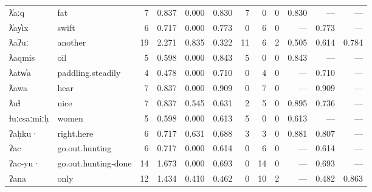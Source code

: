 \begin{landscape}
\begin{longtable}[c]{ l l | r r c c | r r r | r r r }
  ƛ̓aːq               & fat                       & 7   & 0.837                     & 0.000           & 0.830      & 7         & 0           & 0            & 0.830     & —           & —\\
  ƛ̓ay̓ix              & swift                     & 6   & 0.717                     & 0.000           & 0.773      & 0         & 6           & 0            & —         & 0.773       & —\\
  ƛaʔuː              & another                   & 19  & 2.271                     & 0.835           & 0.322      & 11        & 6           & 2            & 0.505     & 0.614       & 0.784\\
  ƛaqmis             & oil                       & 5   & 0.598                     & 0.000           & 0.843      & 5         & 0           & 0            & 0.843     & —           & —\\
  ƛatw̓a              & paddling.steadily         & 4   & 0.478                     & 0.000           & 0.710      & 0         & 4           & 0            & —         & 0.710       & —\\
  ƛawa               & hear                      & 7   & 0.837                     & 0.000           & 0.909      & 0         & 7           & 0            & —         & 0.909       & —\\
  ƛuɬ                & nice                      & 7   & 0.837                     & 0.545           & 0.631      & 2         & 5           & 0            & 0.895     & 0.736       & —\\
  ɬuːcsaːmiːḥ        & women                     & 5   & 0.598                     & 0.000           & 0.613      & 5         & 0           & 0            & 0.613     & —           & —\\
  ʔaḥku·             & right.here                & 6   & 0.717                     & 0.631           & 0.688      & 3         & 3           & 0            & 0.881     & 0.807       & —\\
  ʔac                & go.out.hunting            & 6   & 0.717                     & 0.000           & 0.614      & 0         & 6           & 0            & —         & 0.614       & —\\
  ʔac‑yu·            & go.out.hunting‑done       & 14  & 1.673                     & 0.000           & 0.693      & 0         & 14          & 0            & —         & 0.693       & —\\
  ʔana               & only                      & 12  & 1.434                     & 0.410           & 0.462      & 0         & 10          & 2            & —         & 0.482       & 0.863\\

\end{longtable}
\end{landscape}
